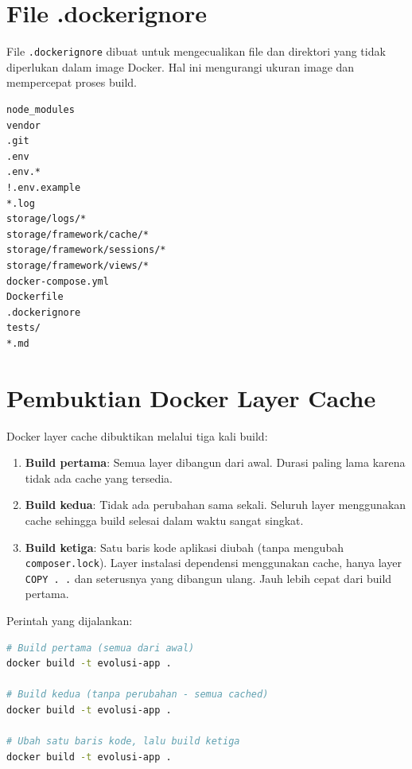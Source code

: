 \documentclass[a4paper,oneside,11pt]{book}
\begin{document}
\section{File .dockerignore}

File \texttt{.dockerignore} dibuat untuk mengecualikan file dan direktori yang tidak diperlukan dalam image Docker. Hal ini mengurangi ukuran image dan mempercepat proses build.

\begin{lstlisting}[caption={Isi file .dockerignore}]
node_modules
vendor
.git
.env
.env.*
!.env.example
*.log
storage/logs/*
storage/framework/cache/*
storage/framework/sessions/*
storage/framework/views/*
docker-compose.yml
Dockerfile
.dockerignore
tests/
*.md
\end{lstlisting}


\section{Pembuktian Docker Layer Cache}

Docker layer cache dibuktikan melalui tiga kali build:

\begin{enumerate}
    \item \textbf{Build pertama}: Semua layer dibangun dari awal. Durasi paling lama karena tidak ada cache yang tersedia.
    \item \textbf{Build kedua}: Tidak ada perubahan sama sekali. Seluruh layer menggunakan cache sehingga build selesai dalam waktu sangat singkat.
    \item \textbf{Build ketiga}: Satu baris kode aplikasi diubah (tanpa mengubah \texttt{composer.lock}). Layer instalasi dependensi menggunakan cache, hanya layer \texttt{COPY . .} dan seterusnya yang dibangun ulang. Jauh lebih cepat dari build pertama.
\end{enumerate}

Perintah yang dijalankan:

\begin{lstlisting}[language=bash, caption={Perintah tiga kali build Docker}]
# Build pertama (semua dari awal)
docker build -t evolusi-app .

# Build kedua (tanpa perubahan - semua cached)
docker build -t evolusi-app .

# Ubah satu baris kode, lalu build ketiga
docker build -t evolusi-app .
\end{lstlisting}
\end{document}
